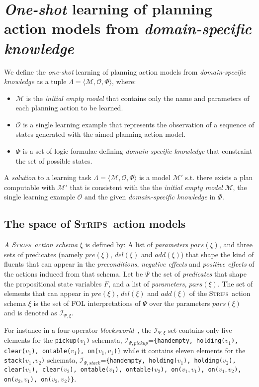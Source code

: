 \documentclass{article}
\newcommand{\tup}[1]{{\langle #1 \rangle}}
\newcommand{\strips}{\textsc{Strips}}
\begin{document}
\section{{\em One-shot} learning of planning action models from {\em domain-specific knowledge}}
\label{sec:learning}
We define the {\em one-shot} learning of planning action models from {\em domain-specific knowledge} as a tuple $\Lambda=\tup{\mathcal{M},{\mathcal O},\Phi}$, where:
\begin{itemize}
\item $\mathcal{M}$ is the {\em initial empty model} that contains only the name and parameters of each planning action to be learned.
\item $\mathcal{O}$ is a single learning example that represents the observation of a sequence of states generated with the aimed planning action model.
\item $\Phi$ is a set of logic formulae defining {\em domain-specific knowledge} that constraint the set of possible states.
\end{itemize}

A {\em solution} to a learning task $\Lambda=\tup{\mathcal{M},{\mathcal O},\Phi}$ is a model $\mathcal{M}'$ s.t. there exists a plan computable with $\mathcal{M}'$ that is consistent with the the {\em initial empty model} $\mathcal{M}$, the single learning example $\mathcal{O}$ and the given {\em domain-specific knowledge} in $\Phi$.

\subsection{The space of \strips\ action models}
{\em A \strips\ action schema} $\xi$ is defined by: A list of {\em parameters} $pars(\xi)$, and three sets of predicates (namely $pre(\xi)$, $del(\xi)$ and $add(\xi)$) that shape the kind of fluents that can appear in the {\em preconditions}, {\em negative effects} and {\em positive effects} of the actions induced from that schema. Let be $\Psi$ the set of {\em predicates} that shape the propositional state variables $F$, and a list of {\em parameters}, $pars(\xi)$. The set of elements that can appear in $pre(\xi)$, $del(\xi)$ and $add(\xi)$ of the \strips\ action schema $\xi$ is the set of FOL interpretations of $\Psi$ over the parameters $pars(\xi)$ and is denoted as ${\mathcal I}_{\Psi,\xi}$.

For instance in a four-operator {\em blocksworld}~\cite{slaney2001blocks}, the ${\mathcal I}_{\Psi,\xi}$ set contains only five elements for the {\small \tt pickup($v_1$)} schemata, ${\mathcal I}_{\Psi,pickup}$={\small\tt\{handempty, holding($v_1$), clear($v_1$), ontable($v_1$), on($v_1,v_1$)\}} while it contains eleven elements for the {\small \tt stack($v_1$,$v_2$)} schemata, ${\mathcal I}_{\Psi,stack}$={\small\tt\{handempty, holding($v_1$), holding($v_2$), clear($v_1$), clear($v_2$), ontable($v_1$), ontable($v_2$), on($v_1,v_1$), on($v_1,v_2$), on($v_2,v_1$), on($v_2,v_2$)\}}.
\end{document}
